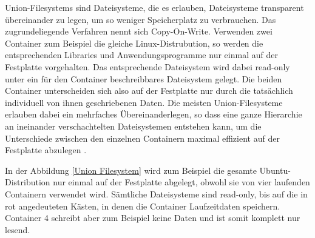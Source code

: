Union-Filesystems sind Dateisysteme, die es erlauben, Dateisysteme transparent übereinander zu legen, um so weniger Speicherplatz zu verbrauchen. Das zugrundeliegende Verfahren nennt sich Copy-On-Write. Verwenden zwei Container zum Beispiel die gleiche Linux-Distrubution, so werden die entsprechenden Libraries und Anwendungsprogramme nur einmal auf der Festplatte vorgehalten. Das entsprechende Dateisystem wird dabei read-only unter ein für den Container beschreibbares Dateisystem gelegt. Die beiden Container unterscheiden sich also auf der Festplatte nur durch die tatsächlich individuell von ihnen geschriebenen Daten. Die meisten Union-Filesysteme erlauben dabei ein mehrfaches Übereinanderlegen, so dass eine ganze Hierarchie an ineinander verschachtelten Dateisystemen entstehen kann, um die Unterschiede zwischen den einzelnen Containern maximal effizient auf der Festplatte abzulegen \citep[Vgl.][S. 3]{Schee14}.

In der Abbildung \ref{Union Filesystem} wird zum Beispiel die gesamte Ubuntu-Distribution nur einmal auf der Festplatte abgelegt, obwohl sie von vier laufenden Containern verwendet wird. Sämtliche Dateisysteme sind read-only, bis auf die in rot angedeuteten Kästen, in denen die Container Laufzeitdaten speichern. Container 4 schreibt aber zum Beispiel keine Daten und ist somit komplett nur lesend.

